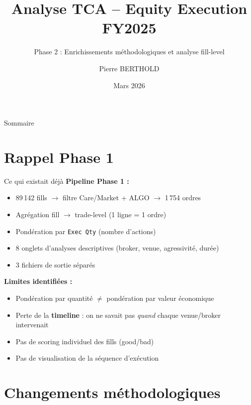 \documentclass[10pt]{beamer}
\title{Analyse TCA -- Equity Execution FY2025}
\subtitle{Phase 2 : Enrichissements méthodologiques et analyse fill-level}
\author{Pierre BERTHOLD}
\date{Mars 2026}
\begin{document}
\begin{frame}
\titlepage
\end{frame}

\begin{frame}{Sommaire}
\tableofcontents
\end{frame}

\section{Rappel Phase 1}

\begin{frame}{Ce qui existait déjà}
\textbf{Pipeline Phase 1 :}
\begin{itemize}
    \item 89\,142 fills $\rightarrow$ filtre Care/Market + ALGO $\rightarrow$ 1\,754 ordres
    \item Agrégation fill $\rightarrow$ trade-level (1 ligne = 1 ordre)
    \item Pondération par \texttt{Exec Qty} (nombre d'actions)
    \item 8 onglets d'analyses descriptives (broker, venue, agressivité, durée)
    \item 3 fichiers de sortie séparés
\end{itemize}

\vspace{0.3cm}
\textbf{Limites identifiées :}
\begin{itemize}
    \item Pondération par quantité $\neq$ pondération par valeur économique
    \item Perte de la \textbf{timeline} : on ne savait pas \textit{quand} chaque venue/broker intervenait
    \item Pas de scoring individuel des fills (good/bad)
    \item Pas de visualisation de la séquence d'exécution
\end{itemize}
\end{frame}

\section{Changements méthodologiques}
\end{document}
